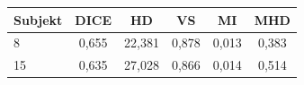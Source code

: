 \begin{tabular}{l c c c c c}
 \hline
Subjekt & DICE & HD & VS & MI & MHD \\ \hline
8 & 0,655 & 22,381 & 0,878 & 0,013 & 0,383 \\
15 & 0,635 & 27,028 & 0,866 & 0,014 & 0,514 \\
\hline 
 \end{tabular}
